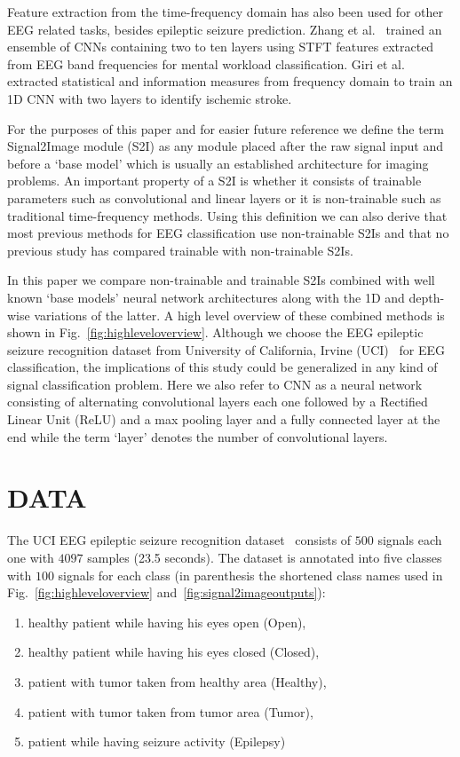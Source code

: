 \documentclass[conference]{IEEEtran}
\begin{document}
Feature extraction from the time-frequency domain has also been used for other EEG related tasks, besides epileptic seizure prediction.
Zhang et al.~\cite{zhang2017pattern} trained an ensemble of CNNs containing two to ten layers using STFT features extracted from EEG band frequencies for mental workload classification.
Giri et al.~\cite{giri2016ischemic} extracted statistical and information measures from frequency domain to train an 1D CNN with two layers to identify ischemic stroke.

For the purposes of this paper and for easier future reference we define the term Signal2Image module (S2I) as any module placed after the raw signal input and before a `base model' which is usually an established architecture for imaging problems.
An important property of a S2I is whether it consists of trainable parameters such as convolutional and linear layers or it is non-trainable such as traditional time-frequency methods.
Using this definition we can also derive that most previous methods for EEG classification use non-trainable S2Is and that no previous study has compared trainable with non-trainable S2Is.

In this paper we compare non-trainable and trainable S2Is combined with well known `base models' neural network architectures along with the 1D and depth-wise variations of the latter.
A high level overview of these combined methods is shown in Fig.~\ref{fig:highleveloverview}.
Although we choose the EEG epileptic seizure recognition dataset from University of California, Irvine (UCI)~\cite{andrzejak2001indications} for EEG classification, the implications of this study could be generalized in any kind of signal classification problem.
Here we also refer to CNN as a neural network consisting of alternating convolutional layers each one followed by a Rectified Linear Unit (ReLU) and a max pooling layer and a fully connected layer at the end while the term `layer' denotes the number of convolutional layers.

\section{DATA}
The UCI EEG epileptic seizure recognition dataset~\cite{andrzejak2001indications} consists of $500$ signals each one with $4097$ samples (23.5 seconds).
The dataset is annotated into five classes with $100$ signals for each class (in parenthesis the shortened class names used in Fig.~\ref{fig:highleveloverview} and~\ref{fig:signal2imageoutputs}):
\begin{enumerate}
  \item healthy patient while having his eyes open (Open),
  \item healthy patient while having his eyes closed (Closed),
  \item patient with tumor taken from healthy area (Healthy),
  \item patient with tumor taken from tumor area (Tumor),
  \item patient while having seizure activity (Epilepsy)
\end{enumerate}
\end{document}
